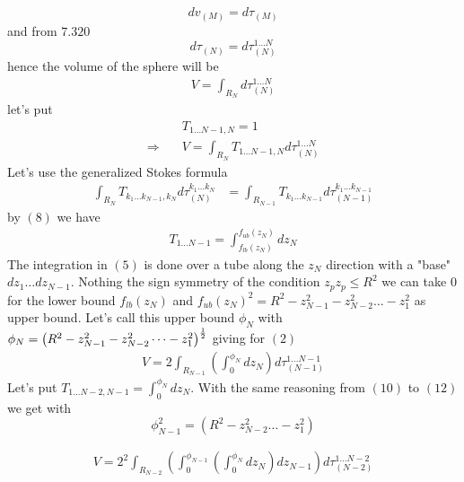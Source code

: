 $$dv_{(M)}= d\tau_{(M)}$$
and from $\mathbf{7.320}$
$$d\tau_{(N)}=d\tau_{(N)}^{1\dots N}$$
hence the volume of the sphere will be 
\begin{align}
V = \int_{R_N} d\tau_{(N)}^{1\dots N}
\end{align}
let's put
\begin{align}
&T_{1\dots N-1,N} =  1\\
\Rightarrow \quad &V = \int_{R_N} T_{1\dots N-1,N}d\tau_{(N)}^{1\dots N} 
\end{align}
Let's use the generalized Stokes formula
\begin{align}
\int_{R_N} T_{k_1\dots k_{N-1},k_N} d\tau_{(N)}^{k_1 \dots k_N} &= \int_{R_{N-1}} T_{k_1\dots k_{N-1}}d\tau_{(N-1)}^{k_1 \dots k_{N-1}}
\end{align}
by $(8)$ we have 
\begin{align}
T_{1\dots N-1} =  \int_{f_{lb}(z_{N})}^{f_{ub}(z_{N})}dz_{N} 
\end{align}
The integration in $(5)$ is done over a tube along the $z_{N}$ direction with a "base" $dz_{1}\dots dz_{N-1}$. Nothing the sign symmetry of the condition $z_pz_p \leq R^2$ we can take $0$  for the lower bound $f_{lb}(z_{N})$ and $f_{ub}(z_{N})^2 = R^2- z_{N-1}^2- z_{N-2}^2\dots  -z_{1}^2 $ as upper bound. Let's call this upper bound $\phi_{N}$ with $\phi_{N} =\left(R^2- z_{N-1}^2- z_{N-2}^2\dots  -z_{1}^2\right)^{\frac{1}{2}}$
giving for $(2)$
\begin{align}
V = 2\int_{R_{N-1}}\left(\int_{0}^{\phi_{N}}dz_{N}\right)d\tau_{(N-1)}^{1 \dots N-1}
\end{align}
Let's put $T_{1\dots N-2,N-1} = \int_{0}^{\phi_{N}}dz_{N}$. With the same reasoning from $(10)$ to $(12)$
we get with 
$$\phi_{N-1}^2 = \left(R^2 - z_{N-2}^2\dots  -z_{1}^2\right)$$  
 
\begin{align}
V = 2^2\int_{R_{N-2}}\left(\int_{0}^{\phi_{N-1}}\left(\int_{0}^{\phi_{N}}dz_{N}\right)dz_{N-1}\right)d\tau_{(N-2)}^{1 \dots N-2}
\end{align}

